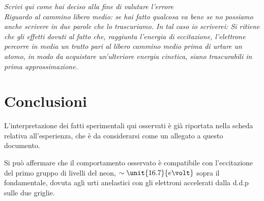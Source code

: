 \documentclass[10pt,a4paper]{article}
\begin{document}
\emph{\LARGE Scrivi qui come hai deciso alla fine di valutare l'errore \\
 Riguardo al cammino libero medio: se hai fatto qualcosa va bene se no possiamo anche scrivere in due parole che lo trascuriamo. In tal caso io scriverei:
 Si ritiene che gli effetti dovuti al fatto che, raggiunta l’energia di eccitazione, l’elettrone percorre in media un tratto pari al libero cammino medio prima di urtare un atomo, in modo da acquistare un’ulteriore energia cinetica, siano trascurabili in prima approssimazione.}


\section{Conclusioni}
L'interpretazione dei fatti sperimentali qui osservati è già riportata nella scheda relativa all'esperienza, che è da considerarsi come un allegato a questo documento.

Si può affermare che il comportamento osservato è compatibile con l'eccitazione del primo gruppo di livelli del neon, $\sim \unit{16.7}{e\volt}$ sopra il fondamentale, dovuta agli urti anelastici con gli elettroni accelerati dalla d.d.p sulle due griglie.
\end{document}
